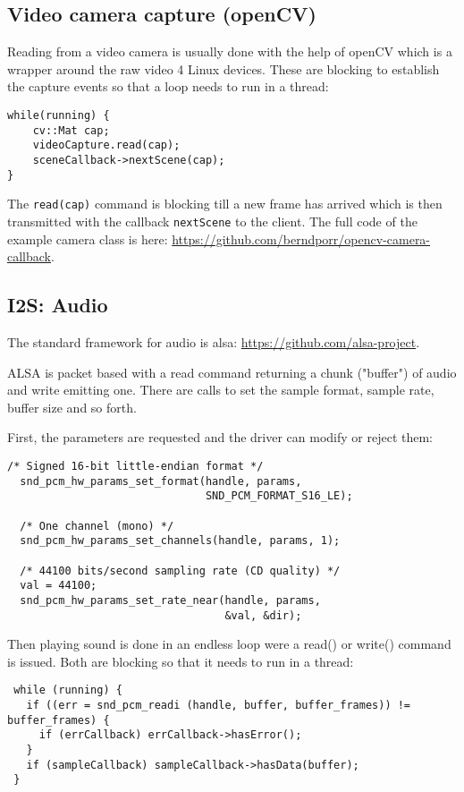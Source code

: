\documentclass[12pt]{report}
\begin{document}
\subsection{Video camera capture (openCV)}
Reading from a video camera is usually done with the help of openCV
which is a wrapper around the raw video 4 Linux devices. These are
blocking to establish the capture events so that a loop needs to run in
a thread:
\begin{verbatim}
while(running) {
    cv::Mat cap;
    videoCapture.read(cap);
    sceneCallback->nextScene(cap);
}
\end{verbatim}
The \texttt{read(cap)} command is blocking till a new frame has
arrived which is then transmitted with the callback \texttt{nextScene}
to the client. The full code of the example camera class is here:
\url{https://github.com/berndporr/opencv-camera-callback}.








\subsection{I2S: Audio}
The standard framework for audio is alsa: \url{https://github.com/alsa-project}.

ALSA is packet based with a read command
returning a chunk ("buffer") of audio and write emitting one.
There are calls to set the sample format, sample rate, buffer size
and so forth.

First, the parameters are requested and the driver can modify or
reject them:
\begin{verbatim}
/* Signed 16-bit little-endian format */
  snd_pcm_hw_params_set_format(handle, params,
                               SND_PCM_FORMAT_S16_LE);

  /* One channel (mono) */
  snd_pcm_hw_params_set_channels(handle, params, 1);

  /* 44100 bits/second sampling rate (CD quality) */
  val = 44100;
  snd_pcm_hw_params_set_rate_near(handle, params,
                                  &val, &dir);
\end{verbatim}

Then playing sound is done in an endless loop were a read()
or write() command is issued. Both are blocking so that
it needs to run in a thread:

\begin{verbatim}
 while (running) {
   if ((err = snd_pcm_readi (handle, buffer, buffer_frames)) != buffer_frames) {
     if (errCallback) errCallback->hasError();
   }
   if (sampleCallback) sampleCallback->hasData(buffer);
 }
\end{verbatim}
\end{document}
